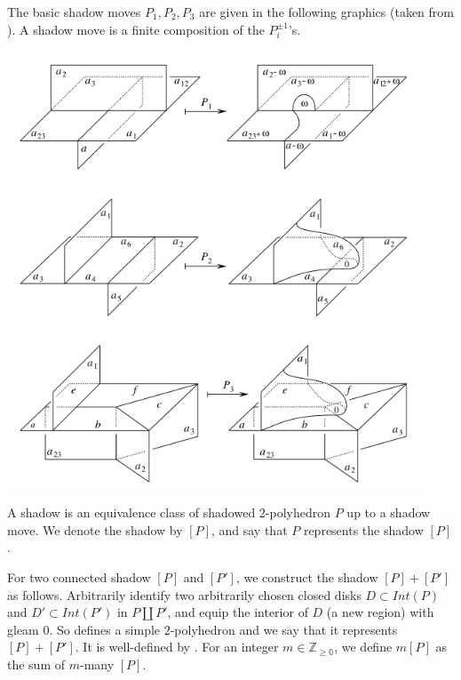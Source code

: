 \begin{definition}\label{def/shadow-moves}
   The basic shadow moves
  $P_{1}, P_{2}, P_{3}$ are given in the following graphics
  (taken from \cite{turaev-qiok-3-manifolds}). A shadow move is a
  finite composition of the $P_{i}^{\pm 1}$'s.
  \begin{center}
    \includegraphics[height=13cm]{shadow-move--taken-from-turaev}
  \end{center}
\end{definition}

\begin{definition}[shadow]\label{def/shadow}
  A shadow is an equivalence class of shadowed $2$-polyhedron $P$
  up to a shadow move. We denote the shadow by $[P]$, and say
  that $P$ represents the shadow $[P]$
  \cite[p.370]{turaev-qiok-3-manifolds}.
\end{definition}

\noindent For two connected shadow $[P]$ and $[P']$, we construct
the shadow $[P]+[P']$ as follows. Arbitrarily identify two
arbitrarily chosen closed disks $D \subset Int(P)$ and
$D' \subset Int(P')$ in $P \coprod P'$, and equip the interior of
$D$ (a new region) with gleam $0$. So defines a simple
$2$-polyhedron and we say that it represents $[P]+[P']$. It is
well-defined by \cite[lemma VIII.2.1.1]{turaev-qiok-3-manifolds}.
For an integer $m \in \mathbb{Z_{\geq 0}}$, we define $m[P]$ as
the sum of $m$-many $[P]$.

